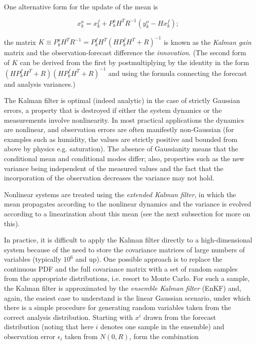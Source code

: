 One alternative form for the update of the mean is

\begin{equation}
x_k^a = x_k^f + P_k^a H^T R^{-1} \left ( y_k^o-H x_k^f \right );
\end{equation}

the matrix $K \equiv P_k^a H^T R^{-1} = P_k^f H^T \left( H P_k^f H^T + R \right )^{-1}$ is known as the {\it Kalman gain} matrix and the observation-forecast difference the {\it innovation}.  
(The second form of $K$ can be derived from the first by postmultiplying by the identity in the form $\left ( H P_k^f H^T+R \right ) \left ( H P_k^f H^T+R \right )^{-1}$ and using the formula connecting the forecast and analysis variances.)

The Kalman filter is optimal (indeed analytic) in the case of strictly Gaussian errors, a property that is destroyed if either the system dynamics or the measurements involve nonlinearity.  
In most practical applications the dynamics are nonlinear, and observation errors are often manifestly non-Gaussian (for examples such as humidity, the values are strictly positive and bounded from above by physics e.g. saturation).  
The absence of Gaussianity means that the conditional mean and conditional modes differ; also, properties such as the new variance being independent of the measured values and the fact that the incorporation of the observation decreases the variance may not hold.

Nonlinear systems are treated using the {\it extended Kalman filter}, in which the mean propagates according to the nonlinear dynamics and the variance is evolved according to a linearization about this mean (see the next subsection for more on this).

In practice, it is difficult to apply the Kalman filter directly to a high-dimensional system because of the need to store the covariance matrices of large numbers of variables (typically $10^6$ and up).  
One possible approach is to replace the continuous PDF and the full covariance matrix with a set of random samples from the appropriate distributions, i.e. resort to Monte Carlo.  
For such a sample, the Kalman filter is approximated by the {\it ensemble Kalman filter} (EnKF) and, again, the easiest case to understand is the linear Gaussian scenario, under which there is a simple procedure for generating random variables taken from the correct analysis distribution.  Starting with $x^i$ drawn from the forecast distribution (noting that here $i$ denotes one sample in the ensemble) and observation error $\epsilon_i$ taken from $N(0, R)$, form the combination 

